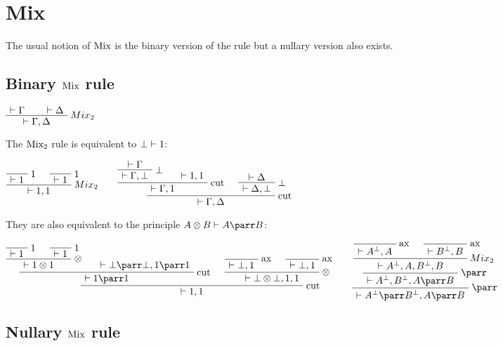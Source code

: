 \section{Mix}\label{mix}

The usual notion of \(\operatorname{Mix}\) is the binary version of the rule
but a nullary version also exists.

\subsection{\texorpdfstring{Binary \(\operatorname{Mix}\)
rule}{Binary \textbackslash{}rulename\{Mix\} rule}}\label{binary-rulenamemix-rule}

\(\AxRule{\vdash\Gamma}
\AxRule{\vdash\Delta}
\LabelRule{Mix_2}
\BinRule{\vdash\Gamma,\Delta}
\DisplayProof\)

The \(\operatorname{Mix_2}\) rule is equivalent to \(\bot\vdash1\):

\(\LabelRule{\one}
\NulRule{\vdash\one}
\LabelRule{\one}
\NulRule{\vdash\one}
\LabelRule{Mix_2}
\BinRule{\vdash\one,\one}
\DisplayProof
\qquad
\AxRule{\vdash\Gamma}
\LabelRule{\bot}
\UnaRule{\vdash\Gamma,\bot}
\AxRule{\vdash\one,\one}
\LabelRule{\rulename{cut}}
\BinRule{\vdash\Gamma,\one}
\AxRule{\vdash\Delta}
\LabelRule{\bot}
\UnaRule{\vdash\Delta,\bot}
\LabelRule{\rulename{cut}}
\BinRule{\vdash\Gamma,\Delta}
\DisplayProof\)

They are also equivalent to the principle \(A\tens B \vdash A\parr B\):

\(\LabelRule{\one}
\NulRule{\vdash\one}
\LabelRule{\one}
\NulRule{\vdash\one}
\LabelRule{\tens}
\BinRule{\vdash\one\tens\one}
\AxRule{\vdash\bot\parr\bot,\one\parr\one}
\LabelRule{\rulename{cut}}
\BinRule{\vdash\one\parr\one}
\LabelRule{\rulename{ax}}
\NulRule{\vdash\bot,\one}
\LabelRule{\rulename{ax}}
\NulRule{\vdash\bot,\one}
\LabelRule{\tens}
\BinRule{\vdash\bot\tens\bot,\one,\one}
\LabelRule{\rulename{cut}}
\BinRule{\vdash\one,\one}
\DisplayProof
\qquad
\LabelRule{\rulename{ax}}
\NulRule{\vdash A\orth,A}
\LabelRule{\rulename{ax}}
\NulRule{\vdash B\orth,B}
\LabelRule{Mix_2}
\BinRule{\vdash A\orth,A,B\orth,B}
\LabelRule{\parr}
\UnaRule{\vdash A\orth,B\orth,A\parr B}
\LabelRule{\parr}
\UnaRule{\vdash A\orth\parr B\orth,A\parr B}
\DisplayProof\)

\subsection{\texorpdfstring{Nullary \(\operatorname{Mix}\)
rule}{Nullary \textbackslash{}rulename\{Mix\} rule}}\label{nullary-rulenamemix-rule}

